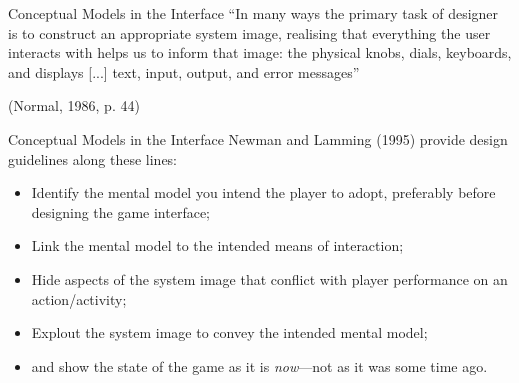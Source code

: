 \begin{frame}{Conceptual Models in the Interface}
	``In many ways the primary task of designer is to construct an appropriate system image, realising that everything the user interacts with helps us to inform that image:
	the physical knobs, dials, keyboards, and displays [...] text, input, output, and error messages''
	
	\vspace{2ex}
	
	(Normal, 1986, p. 44)
\end{frame}

\begin{frame}{Conceptual Models in the Interface}
	Newman and Lamming (1995) provide design guidelines along these lines:

	\begin{itemize}
		\item Identify the mental model you intend the player to adopt, preferably before designing the game interface;
		\item Link the mental model to the intended means of interaction;
		\item Hide aspects of the system image that conflict with player performance on an action/activity;
		\item Explout the system image to convey the intended mental model;
		\item and show the state of the game as it is \textit{now}---not as it was some time ago.
	\end{itemize}
\end{frame}